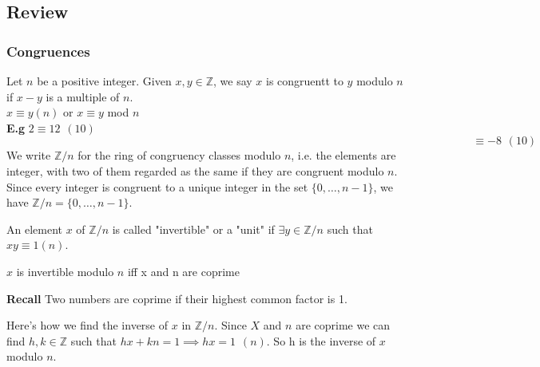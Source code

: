 \documentclass[11pt]{article}
\begin{document}
	\subsection{Review}

	\subsubsection{Congruences}
	Let $n$ be a positive integer. Given $x,y \in \mathbb{Z}$, we say $x$ is congruentt to $y$ modulo $n$ if $x-y$ is a multiple of $n$.\\

	$x \equiv y (n)$  \hspace{10pt} or \hspace{10pt} $x \equiv y$ mod $n$\\[1em]
	\textbf{E.g} \hspace{10pt} $2 \equiv 12 \hspace{5pt} (10)$ \\
	 $ $ $ \hspace{500pt} \equiv -8 \hspace{5pt} (10)$\\[1em]
	We write $\mathbb{Z}/n$ for the ring of congruency classes modulo $n$, i.e. the elements are integer, with two of them regarded as the same if they are congruent modulo $n$.\\

	Since every integer is congruent to a unique integer in the set $\{0,\dots, n-1\}$, we have $\mathbb{Z}/n = \{0,\dots, n-1\}$.

	An element $x$ of $\mathbb{Z}/n $ is called "invertible" or a "unit" if $\exists y \in \mathbb{Z}/n$ such that $xy \equiv 1 (n)$.

	\begin{theorem}
$x$ is invertible modulo $n$ iff x and n are coprime
	\end{theorem}
	\textbf{Recall} Two numbers are coprime if their highest common factor is 1.

	Here's how we find the inverse of $x$ in $\mathbb{Z}/n$. Since $X$ and $n$ are coprime we can find $h, k \in \mathbb{Z}$ such that $hx+kn = 1 \implies hx = 1 \hspace{5pt} (n)$. So h is the inverse of $x$ modulo $n$.
\end{document}
